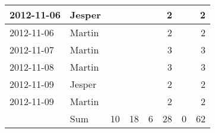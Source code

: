 \begin{table}[htbp]
\begin{tabular}{|l|l|r|r|r|r|r|r|}
    2012-11-06 & Jesper &       &       &       & 2     &       & 2 \bigstrut\\
    \hline
    2012-11-06 & Martin &       &       &       & 2     &       & 2 \bigstrut\\
    \hline
    2012-11-07 & Martin &       &       &       & 3     &       & 3 \bigstrut\\
    \hline
    2012-11-08 & Martin &       &       &       & 3     &       & 3 \bigstrut\\
    \hline
    2012-11-09 & Jesper &       &       &       & 2     &       & 2 \bigstrut\\
    \hline
    2012-11-09 & Martin &       &       &       & 2     &       & 2 \bigstrut\\
    \hline
          & Sum   & 10    & 18    & 6     & 28    & 0     & 62 \bigstrut\\
    \hline
    \end{tabular}%
  \label{tab:addlabel}%
\end{table}%

